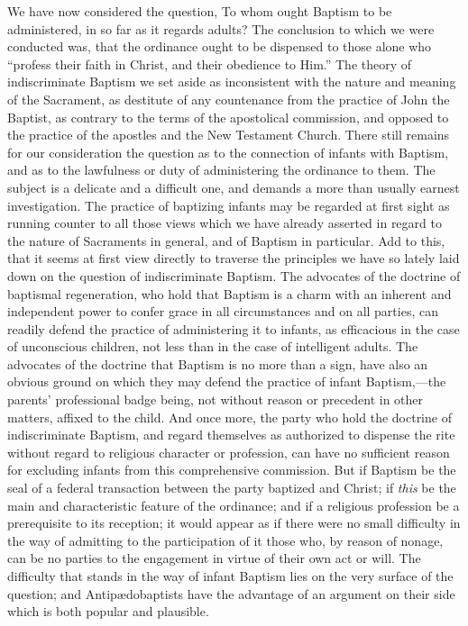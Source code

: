 \documentclass[english,]{book}
\begin{document}
We have now considered the question, To whom ought Baptism to be administered, in so far as it regards adults? The conclusion to which we were conducted was, that the ordinance ought to be dispensed to those alone who ``profess their faith in Christ, and their obedience to Him.'' The theory of indiscriminate Baptism we set aside as inconsistent with the nature and meaning of the Sacrament, as destitute of any countenance from the practice of John the Baptist, as contrary to the terms of the apostolical commission, and opposed to the practice of the apostles and the New Testament Church. There still remains for our consideration the question as to the connection of infants with Baptism, and as to the lawfulness or duty of administering the ordinance to them. The subject is a delicate and a difficult one, and demands a more than usually earnest investigation. The practice of baptizing infants may be regarded at first sight as running counter to all those views which we have already asserted in regard to the nature of Sacraments in general, and of Baptism in particular. Add to this, that it seems at first view directly to traverse the principles we have so lately laid down on the question of indiscriminate Baptism. The advocates of the doctrine of baptismal regeneration, who hold that Baptism is a charm with an inherent and independent power to confer grace in all circumstances and on all parties, can readily defend the practice of administering it to infants, as efficacious in the case of unconscious children, not less than in the case of intelligent adults. The advocates of the doctrine that Baptism is no more than a sign, have also an obvious ground on which they may defend the practice of infant Baptism,---the parents' professional badge being, not without reason or precedent in other matters, affixed to the child. And once more, the party who hold the doctrine of indiscriminate Baptism, and regard themselves as authorized to dispense the rite without regard to religious character or profession, can have no sufficient reason for excluding infants from this comprehensive commission. But if Baptism be the seal of a federal transaction between the party baptized and Christ; if \emph{this} be the main and characteristic feature of the ordinance; and if a religious profession be a prerequisite to its reception; it would appear as if there were no small difficulty in the way of admitting to the participation of it those who, by reason of nonage, can be no parties to the engagement in virtue of their own act or will. The difficulty that stands in the way of infant Baptism lies on the very surface of the question; and Antipædobaptists have the advantage of an argument on their side which is both popular and plausible.
\end{document}
